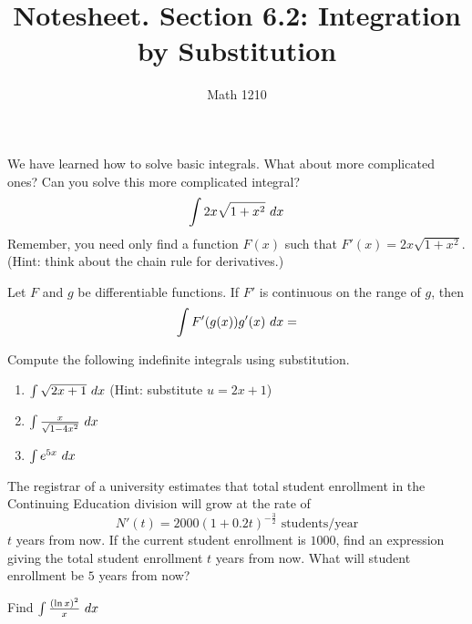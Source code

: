 \documentclass[12pt, a4paper]{article}
\author{Math 1210}
\title{Notesheet. Section 6.2: Integration by Substitution}
\date{}
\begin{document}
\maketitle
\nameline
\begin{ex}
  We have learned how to solve basic integrals. What about more
  complicated ones? Can you solve this more complicated integral? \[
    \int 2x \sqrt{1+x^2} \ d x
  \]
  Remember, you need only find a function \(F(x)\) such that \(F'(x) =
  2x \sqrt{1+x^2}\). (Hint: think about the chain rule for derivatives.)
\end{ex}
\begin{thrm}
  Let \(F\) and \(g\) be differentiable functions. If \(F'\) is
  continuous on the range of \(g\), then \[
    \int F'(g(x))g'(x) \ d x =
  \]
\end{thrm}
\vspace{-1in}
\begin{ex}
  Compute the following indefinite integrals using substitution.
  \begin{enumerate}
  \item \(\int \sqrt{2x+1} \ d x\) (Hint: substitute \(u=2x+1\))
    \vspace{1in}
  \item \(\int \frac{x}{\sqrt{1-4x^2}} \ d x\)
    \vspace{1in}
  \item \(\int e^{5x} \ d x\)
  \end{enumerate}
\end{ex}
\begin{ex}
  The registrar of a university estimates that total student
  enrollment in the Continuing Education division will grow at the
  rate of \[
    N'(t) = 2000(1+0.2t)^{-\frac{3}{2}}
    \text{ students/year}
  \]
  \(t\) years from now. If the current student enrollment is \(1000\),
  find an expression giving the total student enrollment \(t\) years
  from now. What will student enrollment be \(5\) years from now?
\end{ex}
\begin{ex}
  Find \(\int \frac{(\ln x)^2}{x} \ d x\)
\end{ex}

\end{document}
